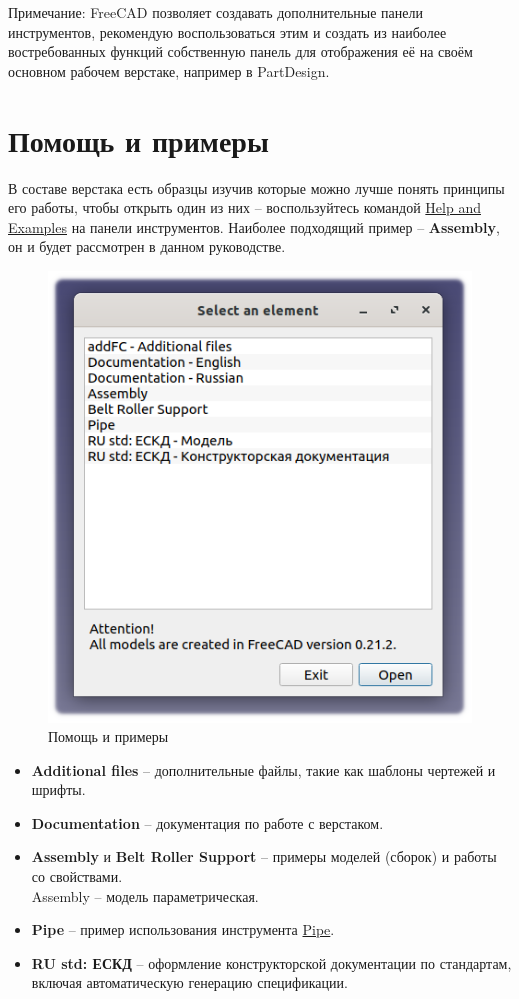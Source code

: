 \documentclass[a4paper,12pt]{article}
\begin{document}
Примечание: FreeCAD позволяет создавать дополнительные панели инструментов, рекомендую воспользоваться этим и создать из наиболее востребованных функций собственную панель для отображения её на своём основном рабочем верстаке, например в PartDesign.

\pagebreak




\section{Помощь и примеры}

В составе верстака есть образцы изучив которые можно лучше понять принципы его работы, чтобы открыть один из них -- воспользуйтесь командой \hyperref[sec:10]{Help and Examples} на панели инструментов. Наиболее подходящий пример -- \textbf{Assembly}, он и будет рассмотрен в данном руководстве.

\begin{figure}[htp]
	\centering
	\includegraphics[scale=1]{img/assistant.png}
	\caption{Помощь и примеры}
	\label{sec:assistant}
\end{figure}

\begin{itemize}
	\item \textbf{Additional files} -- дополнительные файлы, такие как шаблоны чертежей и шрифты.
	\item \textbf{Documentation} -- документация по работе с верстаком.
	\item \textbf{Assembly} и \textbf{Belt Roller Support} -- примеры моделей (сборок) и работы со свойствами.\\Assembly -- модель параметрическая.
	\item \textbf{Pipe} -- пример использования инструмента \hyperref[sec:9]{Pipe}.
	\item \textbf{RU std: ЕСКД} -- оформление конструкторской документации по стандартам,\\включая автоматическую генерацию спецификации.
\end{itemize}
\end{document}
